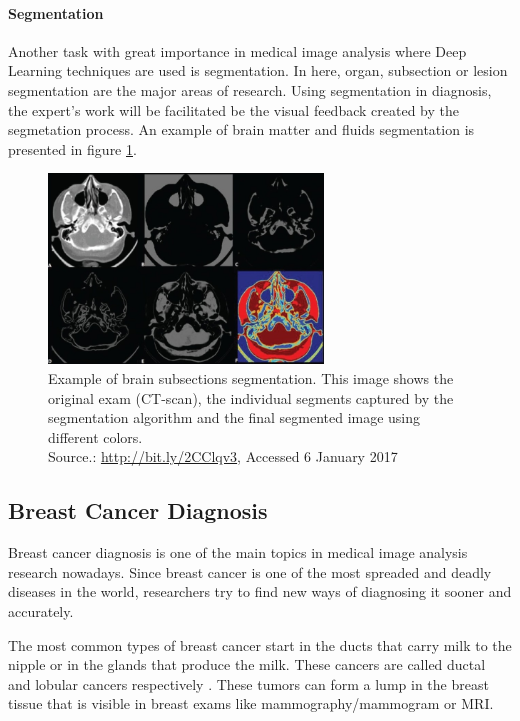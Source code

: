 \documentclass[
  twoside,
  11pt, a4paper,
  footinclude=true,
  headinclude=true,
  cleardoublepage=empty
]{scrbook}
\begin{document}
      \paragraph{Segmentation}
        Another task with great importance in medical image analysis where Deep Learning techniques are used is segmentation. In here, organ, subsection or lesion segmentation are the major areas of research. Using segmentation in diagnosis, the expert's work will be facilitated be the visual feedback created by the segmetation process. An example of brain matter and fluids segmentation is presented in figure \ref{background:medical-image:segmentation}.

        \begin{figure}[t]
          \centering
          \includegraphics[width=0.65\textwidth]{"./img/img-classification-segmentation"}
          \caption[Example of brain subsections segmentation]{Example of brain subsections segmentation. This image shows the original exam (CT-scan), the individual segments captured by the segmentation algorithm and the final segmented image using different colors.
          \\Source.: \href{http://bit.ly/2CClqv3}{http://bit.ly/2CClqv3}, Accessed 6 January 2017}
          \label{background:medical-image:segmentation}
        \end{figure}

      \subsection{Breast Cancer Diagnosis} \label{background:medical-image:breast-cancer-diagnosis}
        Breast cancer diagnosis is one of the main topics in medical image analysis research nowadays. Since breast cancer is one of the most spreaded and deadly diseases in the world, researchers try to find new ways of diagnosing it sooner and accurately.

        The most common types of breast cancer start in the ducts that carry milk to the nipple or in the glands that produce the milk. These cancers are called ductal and lobular cancers respectively \cite{hunt2012diseases}. These tumors can form a lump in the breast tissue that is visible in breast exams like mammography/mammogram or MRI.
\end{document}
